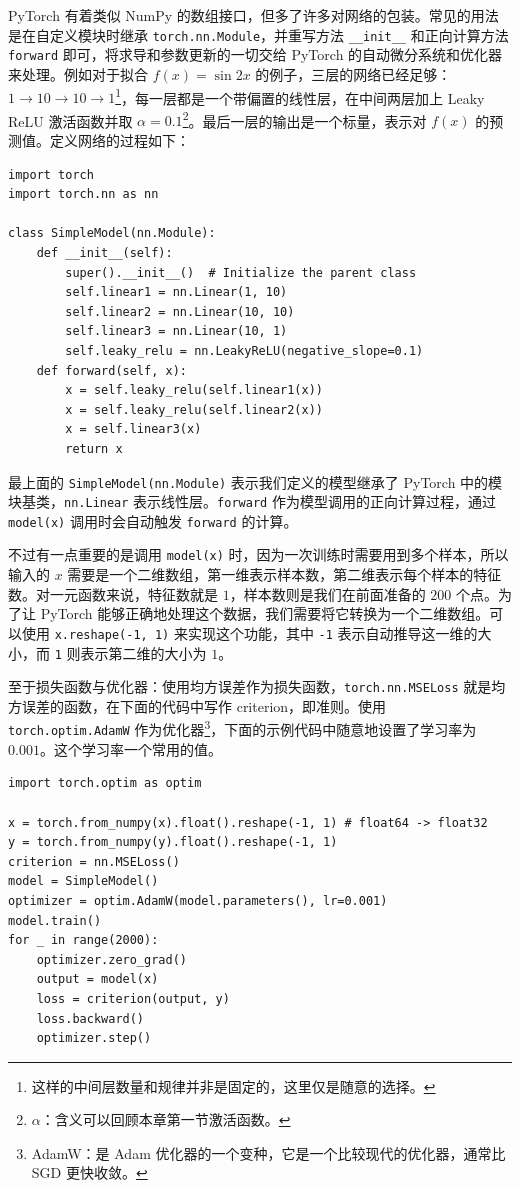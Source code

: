 PyTorch 有着类似 NumPy 的数组接口，但多了许多对网络的包装。常见的用法是在自定义模块时继承 \texttt{torch.nn.Module}，并重写方法 \texttt{\_\_init\_\_} 和正向计算方法 \texttt{forward} 即可，将求导和参数更新的一切交给 PyTorch 的自动微分系统和优化器来处理。例如对于拟合 $f(x) = \sin 2x$ 的例子，三层的网络已经足够：$1\to 10\to 10\to 1$\footnote{这样的中间层数量和规律并非是固定的，这里仅是随意的选择。}，每一层都是一个带偏置的线性层，在中间两层加上 Leaky ReLU 激活函数并取 $\alpha = 0.1$\footnote{$\alpha$：含义可以回顾本章第一节激活函数。}。最后一层的输出是一个标量，表示对 $f(x)$ 的预测值。定义网络的过程如下：
\begin{verbatim}
import torch
import torch.nn as nn

class SimpleModel(nn.Module):
    def __init__(self):
        super().__init__()  # Initialize the parent class
        self.linear1 = nn.Linear(1, 10)
        self.linear2 = nn.Linear(10, 10)
        self.linear3 = nn.Linear(10, 1)
        self.leaky_relu = nn.LeakyReLU(negative_slope=0.1)
    def forward(self, x):
        x = self.leaky_relu(self.linear1(x))
        x = self.leaky_relu(self.linear2(x))
        x = self.linear3(x)
        return x
\end{verbatim}

最上面的 \texttt{SimpleModel(nn.Module)} 表示我们定义的模型继承了 PyTorch 中的模块基类，\texttt{nn.Linear} 表示线性层。\texttt{forward} 作为模型调用的正向计算过程，通过 \texttt{model(x)} 调用时会自动触发 \texttt{forward} 的计算。

不过有一点重要的是调用 \texttt{model(x)} 时，因为一次训练时需要用到多个样本，所以输入的 $x$ 需要是一个二维数组，第一维表示样本数，第二维表示每个样本的特征数。对一元函数来说，特征数就是 $1$，样本数则是我们在前面准备的 $200$ 个点。为了让 PyTorch 能够正确地处理这个数据，我们需要将它转换为一个二维数组。可以使用 \texttt{x.reshape(-1, 1)} 来实现这个功能，其中 \texttt{-1} 表示自动推导这一维的大小，而 \texttt{1} 则表示第二维的大小为 $1$。

至于损失函数与优化器：使用均方误差作为损失函数，\texttt{torch.nn.MSELoss} 就是均方误差的函数，在下面的代码中写作 criterion，即准则。使用 \texttt{torch.optim.AdamW} 作为优化器\footnote{AdamW：是 Adam 优化器的一个变种，它是一个比较现代的优化器，通常比 SGD 更快收敛。}，下面的示例代码中随意地设置了学习率为 $0.001$。这个学习率一个常用的值。
\begin{verbatim}
import torch.optim as optim

x = torch.from_numpy(x).float().reshape(-1, 1) # float64 -> float32
y = torch.from_numpy(y).float().reshape(-1, 1)
criterion = nn.MSELoss()
model = SimpleModel()
optimizer = optim.AdamW(model.parameters(), lr=0.001)
model.train()
for _ in range(2000):
    optimizer.zero_grad()
    output = model(x)
    loss = criterion(output, y)
    loss.backward()
    optimizer.step()
\end{verbatim}

